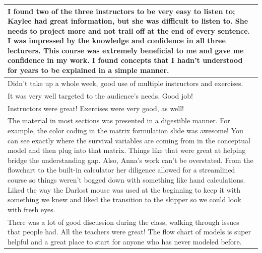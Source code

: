 \documentclass[]{article}
\begin{document}
\begin{table}[H]
\begin{tabular}{l}
\hline
I found two of the three instructors to be very easy to listen to; Kaylee had great information, but she was difficult to listen to. She needs to project more and not trail off at the end of every sentence. I was impressed by the knowledge and confidence in all three lecturers. This course was extremely beneficial to me and gave me confidence in my work. I found concepts that I hadn't understood for years to be explained in a simple manner.\\
\hline
Didn't take up a whole week, good use of multiple instructors and exercises.\\
\hline
It was very well targeted to the audience's needs. Good job!\\
\hline
Instructors were great! Exercises were very good, as well!\\
\hline
The material in most sections was presented in a digestible manner. For example, the color coding in the matrix formulation slide was awesome! You can see exactly where the survival variables are coming from in the conceptual model and then plug into that matrix. Things like that were great at helping bridge the understanding gap. Also, Anna's work can't be overstated. From the flowchart to the built-in calculator her diligence allowed for a streamlined course so things weren't bogged down with something like hand calculations. Liked the way the Darlost mouse was used at the beginning to keep it with something we knew and liked the transition to the skipper so we could look with fresh eyes.\\
\hline
There was a lot of good discussion during the class, walking through issues that people had. All the teachers were great! The flow chart of models is super helpful and a great place to start for anyone who has never modeled before.\\
\hline
\end{tabular}
\end{table}
\end{document}
